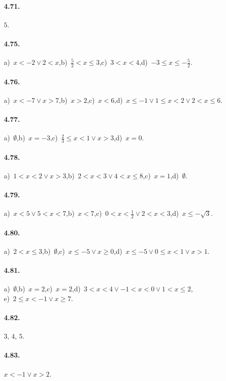 \paragraph{4.71.} $ 5 $.

\paragraph{4.75.} a)~$x<-2\vee 2<x$,\quad b)~$\frac 5 2<x\le 3$,\quad c)~$3<x<4$,\quad d)~$-3\le x\le -\frac 5 2$.

\paragraph{4.76.} a)~$x<-7\vee x>7$,\quad b)~$x>2$,\quad c)~$x<6$,\quad d)~$x\le -1\vee 1\le x<2\vee 2<x\le 6$.

\paragraph{4.77.} a)~$\emptyset $,\quad b)~$x=-3$,\quad c)~$\frac 2 3\le x<1\vee x>3$,\quad d)~$x=0$.

\paragraph{4.78.} a)~$1<x<2\vee x>3$,\quad b)~$2<x<3\vee 4<x\le 8$,\quad c)~$x=1$,\quad d)~$\emptyset $.

\paragraph{4.79.} a)~$x<5\vee 5<x<7$,\quad b)~$x<7$,\quad c)~$0<x<\frac 1 2\vee 2<x<3$,\quad d)~$x\le -\sqrt 3$.

\paragraph{4.80.} a)~$2<x\le 3$,\quad b)~$\emptyset $,\quad c)~$x\le -5\vee x\ge 0$,\quad d)~$x\le -5\vee 0\le x<1\vee x>1$.

\paragraph{4.81.} a)~$\emptyset $,\quad b)~$x=2$,\quad c)~$x=2$,\quad d)~$3<x<4\vee -1<x<0\vee 1<x\le 2$,\protect\\
e)~$2\le x<-1\vee x\ge 7$.

\paragraph{4.82.} $3$, $4$, $5$.

\paragraph{4.83.} $x<-1\vee x>2$.

